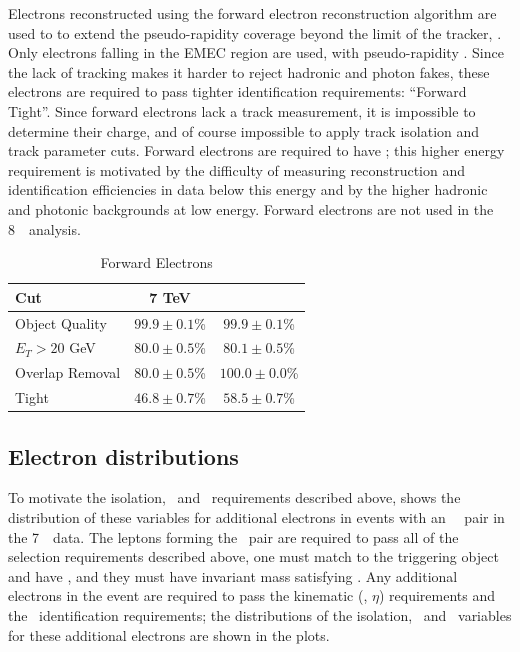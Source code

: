 Electrons reconstructed using the forward electron reconstruction algorithm are
used to to extend the pseudo-rapidity coverage beyond the limit of the tracker,
. Only electrons falling in the EMEC region are used, with
pseudo-rapidity .  Since the lack of tracking makes it
harder to reject hadronic and photon fakes, these electrons are required to
pass tighter identification requirements: ``Forward Tight''. Since forward
electrons lack a track measurement, it is impossible to determine their charge,
and of course impossible to apply track isolation and track parameter cuts.
Forward electrons are required to have ; this higher energy requirement
is motivated by the difficulty of measuring reconstruction and identification
efficiencies in data below this energy and by the higher hadronic and photonic
backgrounds at low energy.
Forward electrons are not used in the 8~\tev\ analysis.

\begin{table}[htbp]
\centering
\begin{tabular}{l|c|c}
\hline\hline
Cut & 7 TeV &  \\
\hline
      Object Quality &   $99.9 \pm 0.1$\% &   $99.9 \pm 0.1$\% \\
      $E_{T}>20$ GeV &   $80.0 \pm 0.5$\% &   $80.1 \pm 0.5$\% \\
        Overlap Removal &   $80.0 \pm 0.5$\% &  $100.0 \pm 0.0$\% \\
               Tight &   $46.8 \pm 0.7$\% &   $58.5 \pm 0.7$\% \\
\hline\hline
\end{tabular}
\caption{Forward Electrons}
\end{table}

\subsection{Electron distributions}

To motivate the isolation, \dzerosig\ and \zzero\ requirements described
above,  shows the distribution of these variables for additional
electrons in events with an \ossf\ \dilepton\ pair in the 7~\tev\ data. 
The leptons forming the \dilepton\ pair are required to pass all of
the selection requirements described above, one must match to the triggering
object and have , and they must have invariant mass satisfying \sstooos. Any additional electrons in the event are required to pass
the kinematic (\pt, $\eta$) requirements and the \loosePP\ identification
requirements; the distributions of the isolation, \dzerosig\ and \zzero\
variables for these additional electrons are shown in the plots. 

